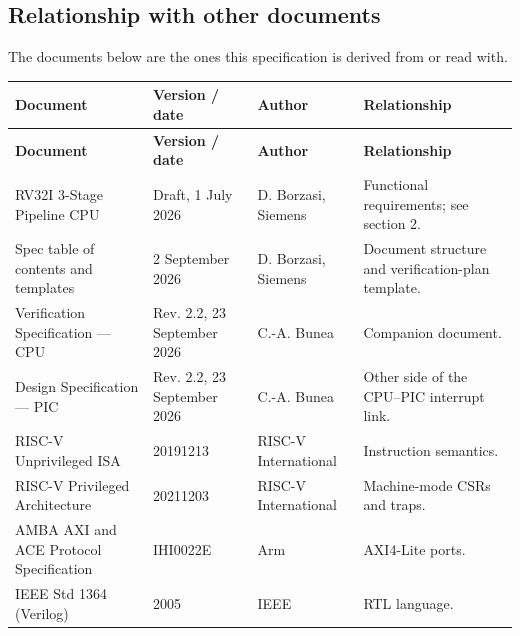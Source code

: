 \documentclass[11pt]{article}
\begin{document}
\subsection{Relationship with other documents}
\noindent The documents below are the ones this specification is derived from or read with.\par\medskip
{\small
\begin{longtable}{@{}L{0.3400\dimexpr\linewidth-36pt\relax}L{0.2200\dimexpr\linewidth-36pt\relax}L{0.1800\dimexpr\linewidth-36pt\relax}L{0.2600\dimexpr\linewidth-36pt\relax}@{}}
\toprule
\textbf{Document} & \textbf{Version / date} & \textbf{Author} & \textbf{Relationship} \\ \midrule
\endfirsthead
\toprule
\textbf{Document} & \textbf{Version / date} & \textbf{Author} & \textbf{Relationship} \\ \midrule
\endhead
RV32I 3-Stage Pipeline CPU & Draft, 1 July 2026 & D. Borzasi, Siemens & Functional requirements; see section 2. \\ \addlinespace[3pt]
Spec table of contents and templates & 2 September 2026 & D. Borzasi, Siemens & Document structure and verification-plan template. \\ \addlinespace[3pt]
Verification Specification — CPU & Rev. 2.2, 23 September 2026 & C.-A. Bunea & Companion document. \\ \addlinespace[3pt]
Design Specification — PIC & Rev. 2.2, 23 September 2026 & C.-A. Bunea & Other side of the CPU–PIC interrupt link. \\ \addlinespace[3pt]
RISC-V Unprivileged ISA & 20191213 & RISC-V International & Instruction semantics. \\ \addlinespace[3pt]
RISC-V Privileged Architecture & 20211203 & RISC-V International & Machine-mode CSRs and traps. \\ \addlinespace[3pt]
AMBA AXI and ACE Protocol Specification & IHI0022E & Arm & AXI4-Lite ports. \\ \addlinespace[3pt]
IEEE Std 1364 (Verilog) & 2005 & IEEE & RTL language. \\*
\bottomrule\end{longtable}}

\end{document}
